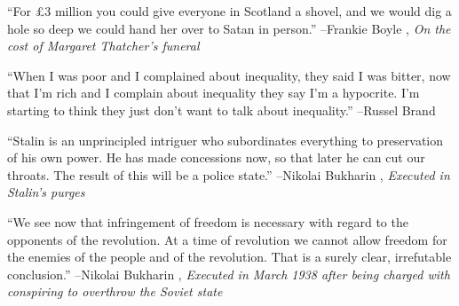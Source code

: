 \documentclass{article}%
\begin{document}
\linebreak%
\vspace{1mm}%
\begin{minipage}{\textwidth}%
\flushleft%
“For £3 million you could give everyone in Scotland a shovel, and we would dig a hole so deep we could hand her over to Satan in person.”%
\linebreak%
\vspace{1mm}%
–Frankie Boyle%
, \textit{On the cost of Margaret Thatcher's funeral}%
\linebreak%
\vspace{1mm}%
\end{minipage}%
\linebreak%
\vspace{1mm}%
\begin{minipage}{\textwidth}%
\flushleft%
“When I was poor and I complained about inequality, they said I was bitter, now that I'm rich and I complain about inequality they say I'm a hypocrite. I'm starting to think they just don't want to talk about inequality.”%
\linebreak%
\vspace{1mm}%
–Russel Brand%
\linebreak%
\vspace{1mm}%
\end{minipage}%
\linebreak%
\vspace{1mm}%
\begin{minipage}{\textwidth}%
\flushleft%
“Stalin is an unprincipled intriguer who subordinates everything to preservation  of his own power. He has made concessions now, so that later he can cut our throats.  The result of this will be a police state.”%
\linebreak%
\vspace{1mm}%
–Nikolai Bukharin%
, \textit{Executed in Stalin's purges}%
\linebreak%
\vspace{1mm}%
\end{minipage}%
\linebreak%
\vspace{1mm}%
\begin{minipage}{\textwidth}%
\flushleft%
“We see now that infringement of freedom is necessary with regard to the opponents of the revolution. At a time of revolution we cannot allow freedom for the enemies of the people and of the revolution. That is a surely clear, irrefutable conclusion.”%
\linebreak%
\vspace{1mm}%
–Nikolai Bukharin%
, \textit{Executed in March 1938 after being charged with conspiring to overthrow the Soviet state}%
\linebreak%
\vspace{1mm}%
\end{minipage}%
\end{document}
